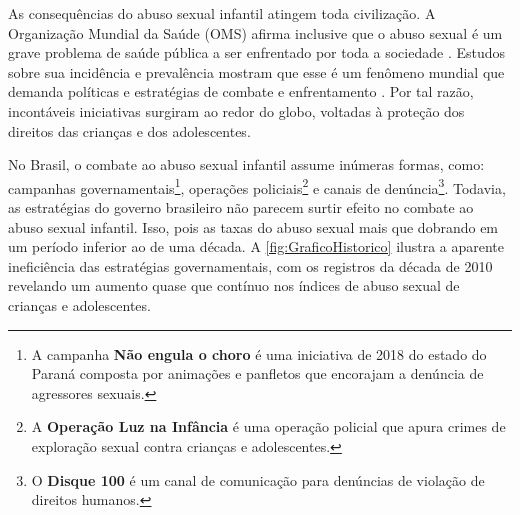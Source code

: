 

As consequências do abuso sexual infantil atingem toda civilização. A Organização Mundial da Saúde (OMS) afirma inclusive que o abuso sexual é um grave problema de saúde pública a ser enfrentado por toda a sociedade \cite{world2017responding}. Estudos sobre  sua  incidência  e prevalência mostram que esse é um fenômeno mundial que demanda políticas e estratégias de combate e enfrentamento \cite{pinto2017avaliaccao}. Por tal razão, incontáveis iniciativas surgiram ao redor do globo, voltadas à proteção dos direitos das crianças e dos adolescentes.





No Brasil, o combate ao abuso sexual infantil assume inúmeras formas, como: campanhas governamentais\footnote{A campanha \textbf{Não engula o choro} é uma iniciativa de 2018 do estado do Paraná composta por animações e panfletos que encorajam a denúncia de agressores sexuais.}, operações policiais\footnote{A \textbf{Operação Luz na Infância} é uma operação policial que apura crimes de exploração sexual contra crianças e adolescentes.} e canais de denúncia\footnote{O \textbf{Disque 100} é um canal de comunicação para denúncias de violação de direitos humanos.}. Todavia, as estratégias do governo brasileiro não parecem surtir efeito no combate ao abuso sexual infantil. Isso, pois as taxas do abuso sexual mais que dobrando em um período inferior ao de uma década. A \autoref{fig:GraficoHistorico} ilustra a aparente ineficiência das estratégias governamentais, com os registros da década de 2010 revelando um aumento quase que contínuo nos índices de abuso sexual de crianças e adolescentes.

